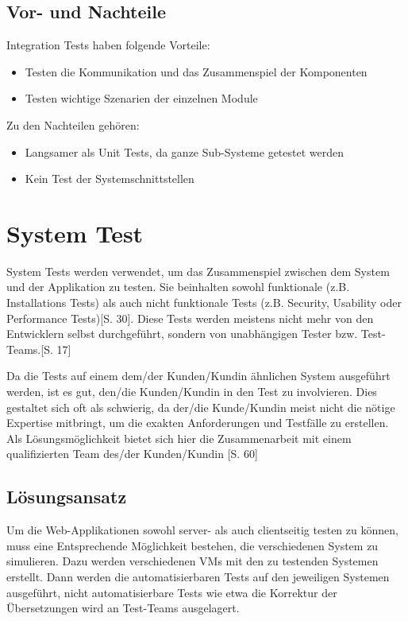 \documentclass[a4paper,bibtotoc,oneside]{scrbook}
\begin{document}
\section{Vor- und Nachteile}
Integration Tests haben folgende Vorteile:

\begin{itemize}
  \item Testen die Kommunikation und das Zusammenspiel der Komponenten
  \item Testen wichtige Szenarien der einzelnen Module
\end{itemize}

Zu den Nachteilen gehören:

\begin{itemize}
  \item Langsamer als Unit Tests, da ganze Sub-Systeme getestet werden
  \item Kein Test der Systemschnittstellen
\end{itemize}


\chapter{System Test}
System Tests werden verwendet, um das Zusammenspiel zwischen dem System und der Applikation zu testen. Sie beinhalten sowohl funktionale (z.B. Installations Tests) als auch nicht funktionale Tests (z.B. Security, Usability oder Performance Tests)\cite{betrieb}[S. 30]. Diese Tests \glqq werden meistens nicht mehr von den Entwicklern selbst durchgeführt, sondern von unabhängigen Tester bzw. Test-Teams.\grqq\cite{eval_regression}[S. 17]

Da die Tests auf einem dem/der Kunden/Kundin ähnlichen System ausgeführt werden, ist es gut, den/die Kunden/Kundin in den Test zu involvieren. Dies gestaltet sich oft als schwierig, da der/die Kunde/Kundin meist nicht die nötige Expertise mitbringt, um die exakten Anforderungen und Testfälle zu erstellen. Als Lösungsmöglichkeit bietet sich hier die Zusammenarbeit mit einem qualifizierten Team des/der Kunden/Kundin \cite{test_large_systems}[S. 60]

\section{Lösungsansatz}
Um die Web-Applikationen sowohl server- als auch clientseitig testen zu können, muss eine Entsprechende Möglichkeit bestehen, die verschiedenen System zu simulieren. Dazu werden verschiedenen VMs mit den zu testenden Systemen erstellt. Dann werden die automatisierbaren Tests auf den jeweiligen Systemen ausgeführt, nicht automatisierbare Tests wie etwa die Korrektur der Übersetzungen wird an Test-Teams ausgelagert.
\end{document}
